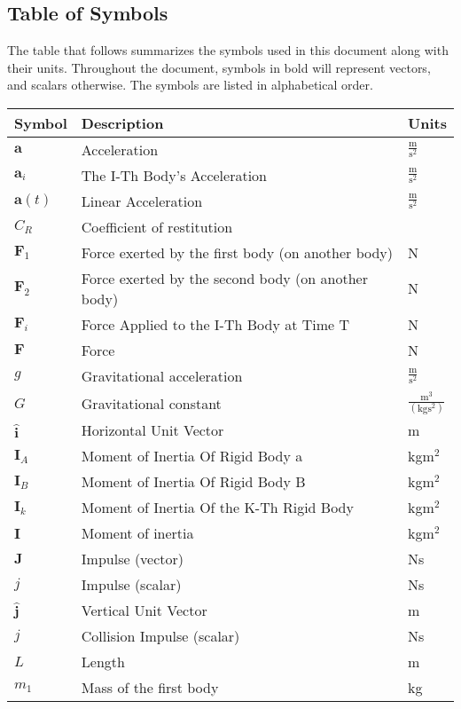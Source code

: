 \documentclass[12pt]{article}
\begin{document}
\subsection{Table of Symbols}
\label{Sec:TablofSymb}
The table that follows summarizes the symbols used in this document along with their units. Throughout the document, symbols in bold will represent vectors, and scalars otherwise. The symbols are listed in alphabetical order.
\begin{longtabu}{l X[l] l}
\toprule
Symbol & Description & Units
\\
\midrule
$\mathbf{a}$ & Acceleration & $\frac{\text{m}}{\text{s}^{2}}$
\\
${\mathbf{a}_{i}}$ & The I-Th Body's Acceleration & $\frac{\text{m}}{\text{s}^{2}}$
\\
$\mathbf{a}(t)$ & Linear Acceleration & $\frac{\text{m}}{\text{s}^{2}}$
\\
${C_{R}}$ & Coefficient of restitution & 
\\
${\mathbf{F}_{1}}$ & Force exerted by the first body (on another body) & N
\\
${\mathbf{F}_{2}}$ & Force exerted by the second body (on another body) & N
\\
${\mathbf{F}_{i}}$ & Force Applied to the I-Th Body at Time T & N
\\
$\mathbf{F}$ & Force & N
\\
$g$ & Gravitational acceleration & $\frac{\text{m}}{\text{s}^{2}}$
\\
$G$ & Gravitational constant & $\frac{\text{m}^{3}}{(\text{kg}\text{s}^{2})}$
\\
$\mathbf{\hat{i}}$ & Horizontal Unit Vector & m
\\
${\mathbf{I}_{A}}$ & Moment of Inertia Of Rigid Body a & kg$\text{m}^{2}$
\\
${\mathbf{I}_{B}}$ & Moment of Inertia Of Rigid Body B & kg$\text{m}^{2}$
\\
${\mathbf{I}_{k}}$ & Moment of Inertia Of the K-Th Rigid Body & kg$\text{m}^{2}$
\\
$\mathbf{I}$ & Moment of inertia & kg$\text{m}^{2}$
\\
$\mathbf{J}$ & Impulse (vector) & Ns
\\
$j$ & Impulse (scalar) & Ns
\\
$\mathbf{\hat{j}}$ & Vertical Unit Vector & m
\\
$j$ & Collision Impulse (scalar) & Ns
\\
$L$ & Length & m
\\
${m_{1}}$ & Mass of the first body & kg

\end{longtabu}
\end{document}
